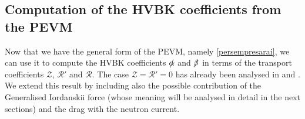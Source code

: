\documentclass[preprints,article,accept,moreauthors,pdftex]{mdpi}
\begin{document}
\subsection{Computation of the HVBK coefficients from the PEVM}
\label{HVBKcacloili}

Now that we have the general form of the PEVM, namely \eqref{persempresarai}, we can use it to compute the HVBK coefficients $\slashed{\alpha}$ and $\slashed{\beta}$ in terms of the transport coefficients $\mathcal{Z}$, $\mathcal{R}'$ and $\mathcal{R}$. The case $\mathcal{Z}=\mathcal{R}'=0$ has already been analysed in \cite{Andersson_Mutual_Friction_2016} and \cite{GavassinoGeometria}. 
We extend this result by including also the possible contribution of the Generalised Iordanskii force (whose meaning will be analysed in detail in the next sections) and the  drag with the neutron current.
\end{document}
